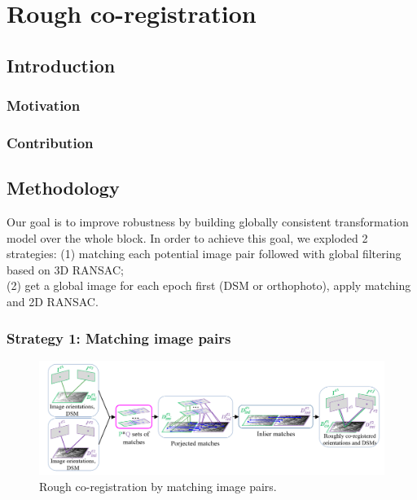 
\chapter{Rough co-registration}
\label{chap:intro}
\minitoc

\section{Introduction}
\subsection{Motivation}

\subsection{Contribution}

\section{Methodology}
Our goal is to improve robustness by building globally consistent transformation model over the whole block.
In order to achieve this goal, we exploded 2 strategies:
(1) matching each potential image pair followed with global filtering based on 3D RANSAC;\\
(2) get a global image for each epoch first (DSM or orthophoto), apply matching and 2D RANSAC.\\

\subsection{Strategy 1: Matching image pairs}
\begin{figure}[htbp]
	\begin{center}
		\includegraphics[width=1\columnwidth]{images/Chapitre3/R3D.png}
		\caption{Rough co-registration by matching image pairs.}
		\label{Flow-process diagram}
	\end{center}
\end{figure}

